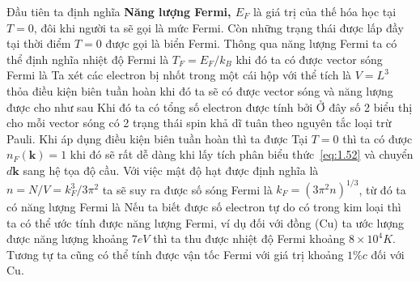 Đầu tiên ta định nghĩa \textbf{Năng lượng Fermi, $E_F$} là giá trị của thế hóa học tại $T=0$, đôi khi người ta sẽ gọi là mức Fermi. Còn những trạng thái được lấp đầy tại thời điểm $T=0$ được gọi là biển Fermi. Thông qua năng lượng Fermi ta có 
thể định nghĩa nhiệt độ Fermi là $T_F = E_F/k_B$ khi đó ta có được vector sóng Fermi là
Ta xét các electron bị nhốt trong một cái hộp với thể tích là $V= L^3$ thỏa điều kiện biên tuần hoàn
khi đó ta sẽ có được vector sóng và năng lượng được cho như sau
Khi đó ta có tổng số electron được tính bởi
Ở đây số 2 biểu thị cho mỗi vector sóng có 2 trạng thái spin khả dĩ tuân theo nguyên tắc loại trừ Pauli. Khi áp dụng điều kiện biên tuần hoàn thì ta được
Tại $T=0$ thì ta có được $n_F(\mathbf{k}) = 1$ khi đó sẽ rất dễ dàng khi lấy tích phân biểu thức~\eqref{eq:1.52} và chuyển $d\mathbf{k}$ sang hệ tọa độ cầu.
Với việc mật độ hạt được định nghĩa là $n = N/V = k_F^3 / 3\pi^2$ ta sẽ suy ra được số sóng Fermi là $k_F = (3\pi^2n)^{1/3}$, từ đó ta có năng lượng Fermi là
Nếu ta biết được số electron tự do có trong kim loại thì ta có thể ước tính được năng lượng Fermi, ví dụ đối với đồng (Cu) ta ước lượng được năng lượng khoảng $7eV$ thì ta thu được nhiệt độ Fermi khoảng $8\times 10^4 K$. Tương tự ta cũng 
có thể tính được vận tốc Fermi với giá trị khoảng $1\%c$ đối với Cu.
